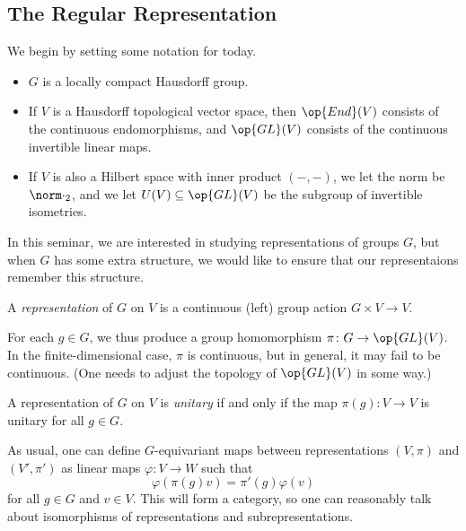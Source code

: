 \documentclass{article}
\begin{document}
\subsection{The Regular Representation}
We begin by setting some notation for today.
\begin{itemize}
	\item $G$ is a locally compact Hausdorff group.
	\item If $V$ is a Hausdorff topological vector space, then $\op{End}(V)$ consists of the continuous endomorphisms, and $\op{GL}(V)$ consists of the continuous invertible linear maps.
	\item If $V$ is also a Hilbert space with inner product $(-,-)$, we let the norm be $\norm\cdot_2$, and we let $U(V)\subseteq\op{GL}(V)$ be the subgroup of invertible isometries.
\end{itemize}
In this seminar, we are interested in studying representations of groups $G$, but when $G$ has some extra structure, we would like to ensure that our representaions remember this structure.
\begin{definition}[representation]
	A \textit{representation} of $G$ on $V$ is a continuous (left) group action $G\times V\to V$.
\end{definition}
\begin{remark}
	For each $g\in G$, we thus produce a group homomorphism $\pi\colon G\to\op{GL}(V)$. In the finite-dimensional case, $\pi$ is continuous, but in general, it may fail to be continuous. (One needs to adjust the topology of $\op{GL}(V)$ in some way.)
\end{remark}
\begin{definition}[unitary]
	A representation of $G$ on $V$ is \textit{unitary} if and only if the map $\pi(g)\colon V\to V$ is unitary for all $g\in G$.
\end{definition}
As usual, one can define $G$-equivariant maps between representations $(V,\pi)$ and $(V',\pi')$ as linear maps $\varphi\colon V\to W$ such that
\[\varphi(\pi(g)v)=\pi'(g)\varphi(v)\]
for all $g\in G$ and $v\in V$. This will form a category, so one can reasonably talk about isomorphisms of representations and subrepresentations.
\end{document}
